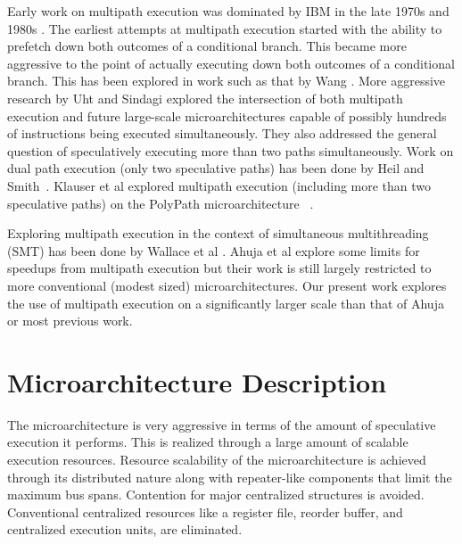 \documentclass[10pt,dvips]{article}
\begin{document}
Early work on multipath execution was
dominated by IBM in the
late 1970s and 1980s \cite{Conners79}.
The earliest attempts at multipath
execution started with the ability to prefetch down both
outcomes of a conditional branch.  This became more aggressive
to the point of actually executing down both outcomes of
a conditional branch.  This has
been explored in work such as that by
Wang \cite{Wang90}.  
More aggressive research by Uht and
Sindagi \cite{Uht95} explored the intersection of both
multipath execution and future large-scale microarchitectures
capable of possibly hundreds of instructions being executed simultaneously.
They also addressed the general question of speculatively executing
more than two paths simultaneously.
Work on dual path execution (only two speculative paths) has
been done by Heil and Smith~\cite{Heil96}.
Klauser et al 
explored multipath execution (including more than two
speculative paths)
on the PolyPath microarchitecture ~\cite{Klauser98}.

Exploring multipath execution in the context of
simultaneous multithreading (SMT)
has been done by
Wallace et al \cite{Wallace98}.  
Ahuja et al \cite{Ahuja98} explore some limits for speedups from
multipath execution but their work is still largely restricted to more
conventional (modest sized) microarchitectures.
Our present work explores the use
of multipath execution on a significantly larger scale
than that of Ahuja or most previous work.
%
%
\section{Microarchitecture Description}
%
The microarchitecture is very aggressive in terms of
the amount of speculative execution it performs.
This is realized through a large amount of scalable execution
resources.
Resource scalability
of the microarchitecture is achieved through its distributed nature
along with repeater-like components that limit the maximum bus
spans.
Contention for major centralized structures is avoided.
Conventional centralized resources like a register file,
reorder buffer, and centralized execution units, are eliminated.
\end{document}
